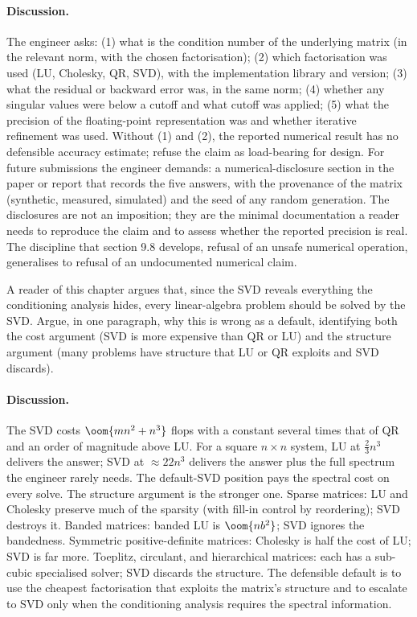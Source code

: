 \paragraph{Discussion.}
The engineer asks: (1) what is the condition number of the
underlying matrix (in the relevant norm, with the chosen
factorisation); (2) which factorisation was used (LU, Cholesky,
QR, SVD), with the implementation library and version; (3) what
the residual or backward error was, in the same norm; (4) whether
any singular values were below a cutoff and what cutoff was
applied; (5) what the precision of the floating-point representation
was and whether iterative refinement was used. Without (1) and
(2), the reported numerical result has no defensible accuracy
estimate; refuse the claim as load-bearing for design. For future
submissions the engineer demands: a numerical-disclosure section
in the paper or report that records the five answers, with the
provenance of the matrix (synthetic, measured, simulated) and the
seed of any random generation. The disclosures are not an
imposition; they are the minimal documentation a reader needs to
reproduce the claim and to assess whether the reported precision is
real. The discipline that section 9.8 develops, refusal of an
unsafe numerical operation, generalises to refusal of an
undocumented numerical claim.

\begin{exercise}
A reader of this chapter argues that, since the SVD reveals
everything the conditioning analysis hides, every linear-algebra
problem should be solved by the SVD. Argue, in one paragraph, why
this is wrong as a default, identifying both the cost argument
(SVD is more expensive than QR or LU) and the structure argument
(many problems have structure that LU or QR exploits and SVD
discards).
\end{exercise}

\paragraph{Discussion.}
The SVD costs $\oom{m n^{2} + n^{3}}$ flops with a constant
several times that of QR and an order of magnitude above LU. For
a square $n \times n$ system, LU at $\tfrac{2}{3}n^{3}$ delivers
the answer; SVD at $\approx 22 n^{3}$ delivers the answer plus
the full spectrum the engineer rarely needs. The default-SVD
position pays the spectral cost on every solve. The structure
argument is the stronger one. Sparse matrices: LU and Cholesky
preserve much of the sparsity (with fill-in control by reordering);
SVD destroys it. Banded matrices: banded LU is $\oom{n b^{2}}$;
SVD ignores the bandedness. Symmetric positive-definite matrices:
Cholesky is half the cost of LU; SVD is far more. Toeplitz,
circulant, and hierarchical matrices: each has a sub-cubic
specialised solver; SVD discards the structure. The defensible
default is to use the cheapest factorisation that exploits the
matrix's structure and to escalate to SVD only when the
conditioning analysis requires the spectral information.
